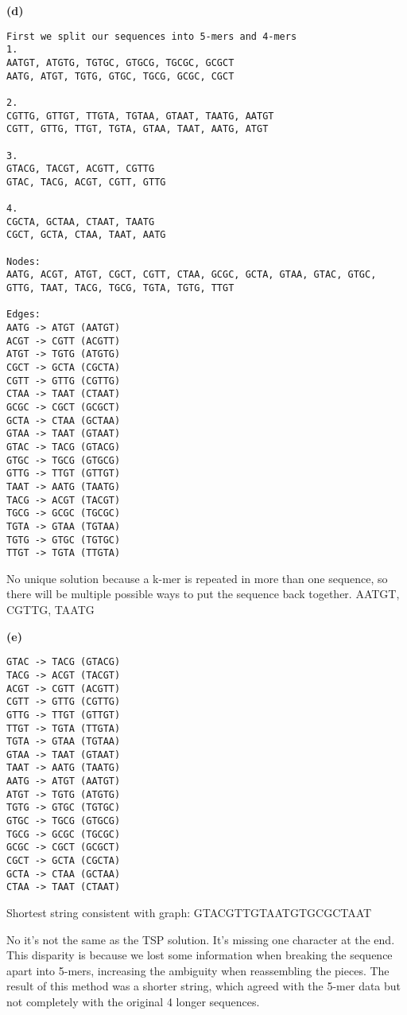 \documentclass[11pt,letterpaper]{article}
\renewcommand{\part}[1] {\vspace{.10in} {\bf (#1)}}
\begin{document}
\part{d}
\begin{verbatim}
First we split our sequences into 5-mers and 4-mers
1.
AATGT, ATGTG, TGTGC, GTGCG, TGCGC, GCGCT
AATG, ATGT, TGTG, GTGC, TGCG, GCGC, CGCT

2.
CGTTG, GTTGT, TTGTA, TGTAA, GTAAT, TAATG, AATGT
CGTT, GTTG, TTGT, TGTA, GTAA, TAAT, AATG, ATGT

3.
GTACG, TACGT, ACGTT, CGTTG
GTAC, TACG, ACGT, CGTT, GTTG

4.
CGCTA, GCTAA, CTAAT, TAATG
CGCT, GCTA, CTAA, TAAT, AATG

Nodes:
AATG, ACGT, ATGT, CGCT, CGTT, CTAA, GCGC, GCTA, GTAA, GTAC, GTGC, GTTG, TAAT, TACG, TGCG, TGTA, TGTG, TTGT

Edges:
AATG -> ATGT (AATGT)
ACGT -> CGTT (ACGTT)
ATGT -> TGTG (ATGTG)
CGCT -> GCTA (CGCTA)
CGTT -> GTTG (CGTTG)
CTAA -> TAAT (CTAAT)
GCGC -> CGCT (GCGCT)
GCTA -> CTAA (GCTAA)
GTAA -> TAAT (GTAAT)
GTAC -> TACG (GTACG)
GTGC -> TGCG (GTGCG)
GTTG -> TTGT (GTTGT)
TAAT -> AATG (TAATG)
TACG -> ACGT (TACGT)
TGCG -> GCGC (TGCGC)
TGTA -> GTAA (TGTAA)
TGTG -> GTGC (TGTGC)
TTGT -> TGTA (TTGTA)
\end{verbatim}

No unique solution because a k-mer is repeated in more than one sequence, so there will be multiple possible ways to put the sequence back together.
AATGT, CGTTG, TAATG

\part{e}
\begin{verbatim}
GTAC -> TACG (GTACG)
TACG -> ACGT (TACGT)
ACGT -> CGTT (ACGTT)
CGTT -> GTTG (CGTTG)
GTTG -> TTGT (GTTGT)
TTGT -> TGTA (TTGTA)
TGTA -> GTAA (TGTAA)
GTAA -> TAAT (GTAAT)
TAAT -> AATG (TAATG)
AATG -> ATGT (AATGT)
ATGT -> TGTG (ATGTG)
TGTG -> GTGC (TGTGC)
GTGC -> TGCG (GTGCG)
TGCG -> GCGC (TGCGC)
GCGC -> CGCT (GCGCT)
CGCT -> GCTA (CGCTA)
GCTA -> CTAA (GCTAA)
CTAA -> TAAT (CTAAT)
\end{verbatim}

Shortest string consistent with graph: GTACGTTGTAATGTGCGCTAAT

No it's not the same as the TSP solution. It's missing one character at the end.
This disparity is because we lost some information when breaking the sequence apart into 5-mers, increasing the ambiguity when reassembling the pieces.
The result of this method was a shorter string, which agreed with the 5-mer data but not completely with the original 4 longer sequences.
\end{document}
